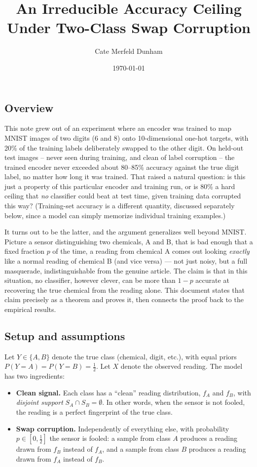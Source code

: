 \documentclass[11pt]{article}
\title{An Irreducible Accuracy Ceiling Under Two-Class Swap Corruption}
\author{Cate Merfeld Dunham}
\date{\today}
\begin{document}
\maketitle

\subsection*{Overview}

This note grew out of an experiment where an encoder was trained to map MNIST
images of two digits (6 and 8) onto 10-dimensional one-hot targets, with 20\%
of the training labels deliberately swapped to the other digit. On held-out
test images -- never seen during training, and clean of label corruption --
the trained encoder never exceeded about 80--85\% accuracy against the true
digit label, no matter how long it was trained. That raised a natural
question: is this just a property of this particular encoder and training
run, or is 80\% a hard ceiling that \emph{no} classifier could beat at test
time, given training data corrupted this way? (Training-set accuracy is a
different quantity, discussed separately below, since a model can simply
memorize individual training examples.)

It turns out to be the latter, and the argument generalizes well beyond
MNIST. Picture a sensor distinguishing two chemicals, A and B, that is bad
enough that a fixed fraction $p$ of the time, a reading from chemical A comes
out looking \emph{exactly} like a normal reading of chemical B (and vice
versa) --- not just noisy, but a full masquerade, indistinguishable from the
genuine article. The claim is that in this situation, no classifier, however
clever, can be more than $1-p$ accurate at recovering the true chemical from
the reading alone. This document states that claim precisely as a theorem
and proves it, then connects the proof back to the empirical results.

\subsection{Setup and assumptions}
\label{sec:setup}

Let $Y \in \{A, B\}$ denote the true class (chemical, digit, etc.), with
equal priors $P(Y=A) = P(Y=B) = \tfrac12$. Let $X$ denote the observed
reading. The model has two ingredients:

\begin{itemize}
  \item \textbf{Clean signal.} Each class has a ``clean'' reading
  distribution, $f_A$ and $f_B$, with \emph{disjoint support} $S_A \cap S_B =
  \emptyset$. In other words, when the sensor is not fooled, the reading is a
  perfect fingerprint of the true class.
  \item \textbf{Swap corruption.} Independently of everything else, with
  probability $p \in [0, \tfrac12]$ the sensor is fooled: a sample from class
  $A$ produces a reading drawn from $f_B$ instead of $f_A$, and a sample from
  class $B$ produces a reading drawn from $f_A$ instead of $f_B$.
\end{itemize}
\end{document}
